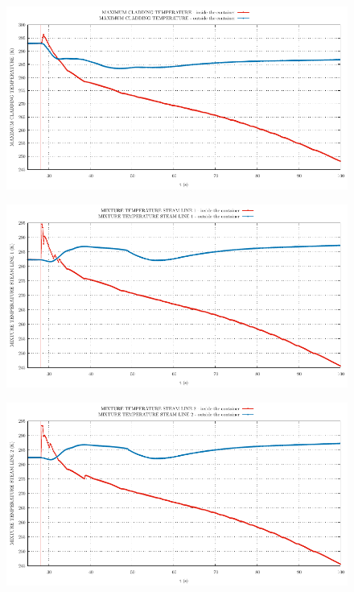 \documentclass{article}
\begin{document}
\begin{multicols}{2}
\begin{figure}[H]
\end{figure}
\begin{figure}[H]
\centering
\includegraphics[width=\linewidth]{./graphs/MAXIMUM CLADDING TEMPERATURE_comp.pdf}
\end{figure}
\begin{figure}[H]
\centering
\includegraphics[width=\linewidth]{./graphs/MIXTURE TEMPERATURE STEAM LINE 1_comp.pdf}
\end{figure}
\begin{figure}[H]
\centering
\includegraphics[width=\linewidth]{./graphs/MIXTURE TEMPERATURE STEAM LINE 2_comp.pdf}

\end{figure}
\end{multicols}
\end{document}
